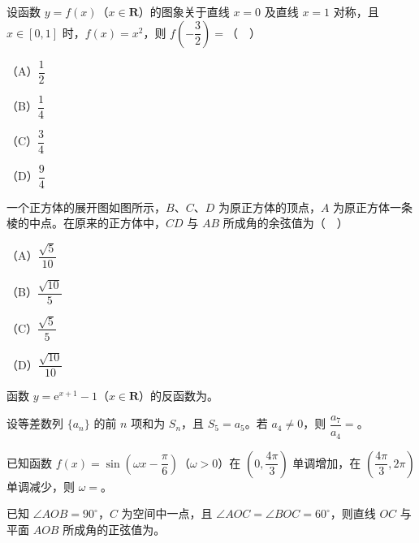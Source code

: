 \begin{question}
设函数 $y=f(x)$（$x\in\mathbf R$）的图象关于直线 $x=0$ 及直线 $x=1$ 对称，且 $x\in[0,1]$ 时，$f(x)=x^2$，则 $f\left(-\dfrac32\right)=$（　）

（A）$\dfrac12$

（B）$\dfrac14$

（C）$\dfrac34$

（D）$\dfrac94$

\Needspace{0.4\textheight}
\end{question}
\begin{question}
一个正方体的展开图如图所示，$B$、$C$、$D$ 为原正方体的顶点，$A$ 为原正方体一条棱的中点。在原来的正方体中，$CD$ 与 $AB$ 所成角的余弦值为（　）

（A）$\dfrac{\sqrt5}{10}$

（B）$\dfrac{\sqrt{10}}5$

（C）$\dfrac{\sqrt5}5$

（D）$\dfrac{\sqrt{10}}{10}$
\nopagebreak[4]
\begin{center}\end{center}
\nopagebreak[4]
\end{question}

\begin{question}
函数 $y=\mathrm e^{x+1}-1$（$x\in\mathbf R$）的反函数为\gkblank{}。

\end{question}
\begin{question}
设等差数列 $\{a_n\}$ 的前 $n$ 项和为 $S_n$，且 $S_5=a_5$。若 $a_4\neq0$，则 $\dfrac{a_7}{a_4}=$\gkblank{}。

\end{question}
\begin{question}
已知函数 $f(x)=\sin\left(\omega x-\dfrac{\pi}6\right)$（$\omega>0$）在 $\left(0,\dfrac{4\pi}3\right)$ 单调增加，在 $\left(\dfrac{4\pi}3,2\pi\right)$ 单调减少，则 $\omega=$\gkblank{}。

\end{question}
\begin{question}
已知 $\angle AOB=90^\circ$，$C$ 为空间中一点，且 $\angle AOC=\angle BOC=60^\circ$，则直线 $OC$ 与平面 $AOB$ 所成角的正弦值为\gkblank{}。

\end{question}

